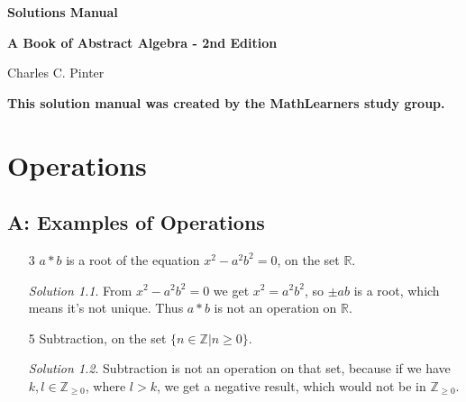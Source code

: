 \documentclass[11pt, b5paper, draft, fleqn]{book}
\theoremstyle{remark}
\newtheorem*{solution}{Solution}
\begin{document}
\begin{titlepage}	
	\begin{center}
	
	\huge
	\textbf{Solutions Manual}
    
	\vspace{2em}
	\Large
	\textbf{A Book of Abstract Algebra - 2nd Edition}
    
	Charles C. Pinter
	
	\vspace{2em}
	\large
	\textbf{This solution manual was created by the MathLearners study group.}
	
	\end{center}
\end{titlepage}

\fancyhf{}
\cleardoublepage
{}
\setcounter{page}{3}
\tableofcontents

\cleardoublepage

\fancyhf{}
\setcounter{page}{5}
\rhead{\thepage}
\lhead{\firstleftmark}

\chapter{Operations}
\section{A: Examples of Operations}
\begin{enumerate}
    \item[3]
	\(a * b\) is a root of the equation \(x^2-a^2b^2 = 0\), on the set \(\mathbb{R}\).
	\begin{solution}
		From \(x^2-a^2b^2 = 0\) we get \(x^2=a^2b^2\), so \(\pm ab\) is a root, which means it's not unique. Thus \(a * b\) is not an operation on \(\mathbb{R}\).
	\end{solution}
	\item[5]
	Subtraction, on the set \(\{n \in \mathbb{Z} | n \geq 0\}\).
	\begin{solution}
		Subtraction is not an operation on that set, because if we have \(k, l \in \mathbb{Z}_{\geq0}\), where \(l > k\), we get a negative result, which would not be in \(\mathbb{Z}_{\geq0}\).
	\end{solution}
\end{enumerate}
\end{document}
